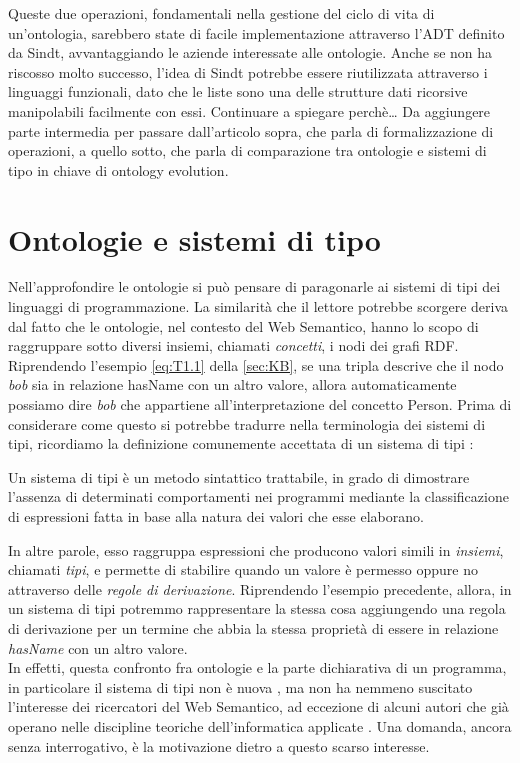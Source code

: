 Queste due operazioni, fondamentali nella gestione del ciclo di vita di un'ontologia, sarebbero state di facile implementazione attraverso l'ADT definito da Sindt, avvantaggiando le aziende interessate alle ontologie. Anche se non ha riscosso molto successo, l'idea di Sindt potrebbe essere riutilizzata attraverso i linguaggi funzionali, dato che le liste sono una delle strutture dati ricorsive manipolabili facilmente con essi. Continuare a spiegare perchè…
Da aggiungere parte intermedia per passare dall'articolo sopra, che parla di formalizzazione di operazioni, a quello sotto, che parla di comparazione tra ontologie e sistemi di tipo in chiave di ontology evolution.


\section{Ontologie e sistemi di tipo}
Nell'approfondire le ontologie si può pensare di paragonarle ai sistemi di tipi dei linguaggi di programmazione. La similarità che il lettore potrebbe scorgere deriva dal fatto che le ontologie, nel contesto del Web Semantico, hanno lo scopo di raggruppare sotto diversi insiemi, chiamati \textit{concetti}, i nodi dei grafi RDF. Riprendendo l'esempio \eqref{eq:T1.1} della \autoref{sec:KB}, se una tripla descrive che il nodo \textsl{bob} sia in relazione hasName con un altro valore, allora automaticamente possiamo dire \textsl{bob} che appartiene all'interpretazione del concetto Person. Prima di considerare come questo si potrebbe tradurre nella terminologia dei sistemi di tipi, ricordiamo la definizione comunemente accettata di un sistema di tipi \cite{pierceTypesBook}:
\begin{definition}
	Un sistema di tipi è un metodo sintattico trattabile, in grado di dimostrare l'assenza di determinati comportamenti nei programmi mediante la classificazione di espressioni fatta in base alla natura dei valori che esse elaborano.
\end{definition}
\noindent
In altre parole, esso raggruppa espressioni che producono valori simili in \textit{insiemi}, chiamati \textit{tipi}, e permette di stabilire quando un valore è permesso oppure no attraverso delle \textsl{regole di derivazione}. Riprendendo l'esempio precedente, allora, in un sistema di tipi potremmo rappresentare la stessa cosa aggiungendo una regola di derivazione per un termine che abbia la stessa proprietà di essere in relazione \textsl{hasName} con un altro valore.\\
In effetti, questa confronto fra ontologie e la parte dichiarativa di un programma, in particolare il sistema di tipi non è nuova \cite{moten2015SWTypeSystem, despeyroux2008evolution}, ma non ha nemmeno suscitato l'interesse dei ricercatori del Web Semantico, ad eccezione di alcuni autori che già operano nelle discipline teoriche dell'informatica applicate \cite{dapoigny2011typetheoryKR, leinbergerphdthesis, ciobanu2016typeFoundationforRDFS}. Una domanda, ancora senza interrogativo, è la motivazione dietro a questo scarso interesse.
